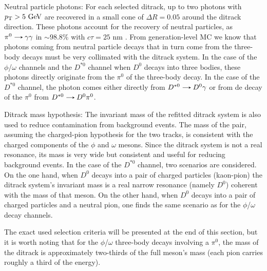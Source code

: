 \begin{myitemlist}
    \item[Neutral particle photons:] For each selected ditrack, up to two photons with $p_\text{T} > 5 \ \text{GeV}$ are recovered in a small cone of $\Delta R = 0.05$ around the ditrack direction. These photons account for the recovery of neutral particles, as $\pi^{0}\decaysto\gamma\gamma$ in $\sim 98.8\%$ with $c\tau=25$ nm \cite{PDG}. From generation-level MC we know that photons coming from neutral particle decays that in turn come from the three-body decays must be very collimated with the ditrack system. In the case of the $\phi$/$\omega$ channels and the $D^{*0}$ channel when $D^{0}$ decays into three bodies, these photons directly originate from the $\pi^0$ of the three-body decay. In the case of the $D^{*0}$ channel, the photon comes either directly from $D^{*0}\decaysto D^{0}\gamma$ or from de decay of the $\pi^0$ from $D^{*0}\decaysto D^{0}\pi^0$. 
    
    \item[Ditrack mass hypothesis:] The invariant mass of the refitted ditrack system is also used to reduce contamination from background events. The mass of the pair, assuming the charged-pion hypothesis for the two tracks, is consistent with the charged components of the $\phi$ and $\omega$ mesons. Since the ditrack system is not a real resonance, its mass is very wide but consistent and useful for reducing background events. In the case of the $D^{*0}$ channel, two scenarios are considered. On the one hand, when $D^{0}$ decays into a pair of charged particles (kaon-pion) the ditrack system's invariant mass is a real narrow resonance (namely $D^{0}$) coherent with the mass of that meson. On the other hand, when $D^{0}$ decays into a pair of charged particles and a neutral pion, one finds the same scenario as for the $\phi$/$\omega$ decay channels.
    
    The exact used selection criteria will be presented at the end of this section, but it is worth noting that for the $\phi$/$\omega$ three-body decays involving a $\pi^0$, the mass of the ditrack is approximately two-thirds of the full meson's mass (each pion carries roughly a third of the energy).


\end{myitemlist}
